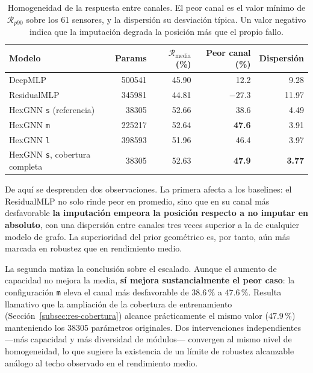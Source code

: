 \begin{table}[htbp]
\centering
\caption{Homogeneidad de la respuesta entre canales. El peor canal es el valor mínimo de
$\mathcal{R}_{p90}$ sobre los 61 sensores, y la dispersión su desviación típica. Un valor negativo
indica que la imputación degrada la posición más que el propio fallo.}
\label{tab:res-robustez}
\small
\begin{tabular}{lrrrr}
\toprule
\textbf{Modelo} & \textbf{Params} & $\mathcal{R}_{\text{media}}$ (\%) & \textbf{Peor canal} (\%) &
\textbf{Dispersión} \\
\midrule
DeepMLP & \num{500541} & 45.90 & 12.2 & 9.28 \\
ResidualMLP & \num{345981} & 44.81 & $\mathbf{-27.3}$ & 11.97 \\
\midrule
HexGNN \texttt{s} (referencia) & \num{38305} & 52.66 & 38.6 & 4.49 \\
HexGNN \texttt{m} & \num{225217} & 52.64 & \textbf{47.6} & 3.91 \\
HexGNN \texttt{l} & \num{398593} & 51.96 & 46.4 & 3.97 \\
HexGNN \texttt{s}, cobertura completa & \num{38305} & 52.63 & \textbf{47.9} & \textbf{3.77} \\
\bottomrule
\end{tabular}
\end{table}

De aquí se desprenden dos observaciones. La primera afecta a los baselines: el ResidualMLP no
solo rinde peor en promedio, sino que en su canal más desfavorable \textbf{la imputación empeora la
posición respecto a no imputar en absoluto}, con una dispersión entre canales tres veces superior a
la de cualquier modelo de grafo. La superioridad del prior geométrico es, por tanto, aún más marcada
en robustez que en rendimiento medio.

La segunda matiza la conclusión sobre el escalado. Aunque el aumento de capacidad no mejora la
media, \textbf{sí mejora sustancialmente el peor caso}: la configuración \texttt{m} eleva el canal
más desfavorable de $38.6\,\%$ a $47.6\,\%$. Resulta llamativo que la ampliación de la cobertura de
entrenamiento (Sección~\ref{subsec:res-cobertura}) alcance prácticamente el mismo valor
($47.9\,\%$) manteniendo los \num{38305} parámetros originales. Dos intervenciones independientes
---más capacidad y más diversidad de módulos--- convergen al mismo nivel de homogeneidad, lo que
sugiere la existencia de un límite de robustez alcanzable análogo al techo observado en el
rendimiento medio.

